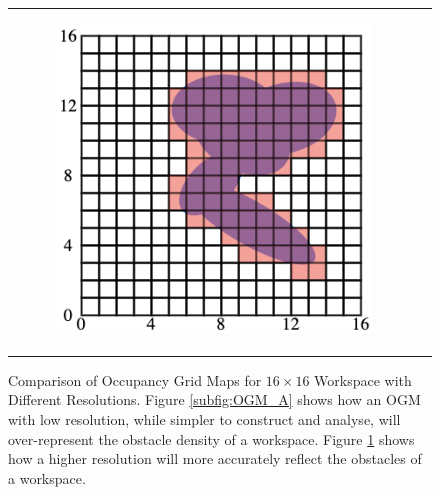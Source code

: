 \begin{figure}[H]
\begin{center}
\begin{tabular}{cc}
\begin{subfigure}{0.4\textwidth}
\begin{center}
    \includegraphics[width=\linewidth]{chapters/chapter2/img/motionPlanning/OGMhighres.png}
    \caption{}
    \label{subfig:OGM_B}
    \end{center}
    \end{subfigure} \\
\end{tabular}
    \caption[Occupancy Grid Maps for $(16\times16)$ Workspace of Different Resolutions]{Comparison of Occupancy Grid Maps for $16\times16$ Workspace with Different Resolutions. Figure \ref{subfig:OGM_A} shows how an OGM with low resolution, while simpler to construct and analyse, will over-represent the obstacle density of a workspace. Figure \ref{subfig:OGM_B} shows how a higher resolution will more accurately reflect the obstacles of a workspace.}
    \label{fig:OGM}

\end{center}
\end{figure}